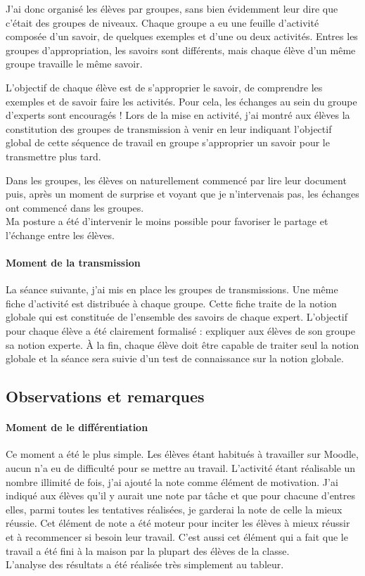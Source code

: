J'ai donc organisé les élèves par groupes, sans bien évidemment leur dire que c'était des groupes de niveaux. Chaque groupe a eu une feuille d'activité composée d'un savoir, de quelques exemples et d'une ou deux activités. Entres les groupes d'appropriation, les savoirs sont différents, mais chaque élève d'un même groupe travaille le même savoir.

L'objectif de chaque élève est de s'approprier le savoir, de comprendre les exemples et de savoir faire les activités. Pour cela, les échanges au sein du groupe d'experts sont encouragés ! Lors de la mise en activité, j'ai montré aux élèves la constitution des groupes de transmission à venir en leur indiquant l'objectif global de cette séquence de travail en groupe s'approprier un savoir pour le transmettre plus tard.

Dans les groupes, les élèves on naturellement commencé par lire leur document puis, après un moment de surprise et voyant que je n'intervenais pas, les échanges ont commencé dans les groupes.
\\
Ma posture a été d'intervenir le moins possible pour favoriser le partage et l'échange entre les élèves.


\paragraph{Moment de la transmission}
%
La séance suivante, j'ai mis en place les groupes de transmissions. Une même fiche d'activité est distribuée à chaque groupe. Cette fiche traite de la notion globale qui est constituée de l'ensemble des savoirs de chaque expert. L'objectif pour chaque élève a été clairement formalisé : expliquer aux élèves de son groupe sa notion experte. À la fin, chaque élève doit être capable de traiter seul la notion globale et la séance sera suivie d'un test de connaissance sur la notion globale.



\subsection{Observations et remarques}



\paragraph{Moment de le différentiation}
%
Ce moment a été le plus simple. Les élèves étant habitués à travailler sur Moodle, aucun n'a eu de difficulté pour se mettre au travail. L'activité étant réalisable un nombre illimité de fois, j'ai ajouté la note comme élément de motivation. J'ai indiqué aux élèves qu'il y aurait une note par tâche et que pour chacune d'entres elles, parmi toutes les tentatives réalisées, je garderai la note de celle la mieux réussie. Cet élément de note a été moteur pour inciter les élèves à mieux réussir et à recommencer si besoin leur travail. C'est aussi cet élément qui a fait que le travail a été fini à la maison par la plupart des élèves de la classe.
\\
L'analyse des résultats a été réalisée très simplement au tableur.


